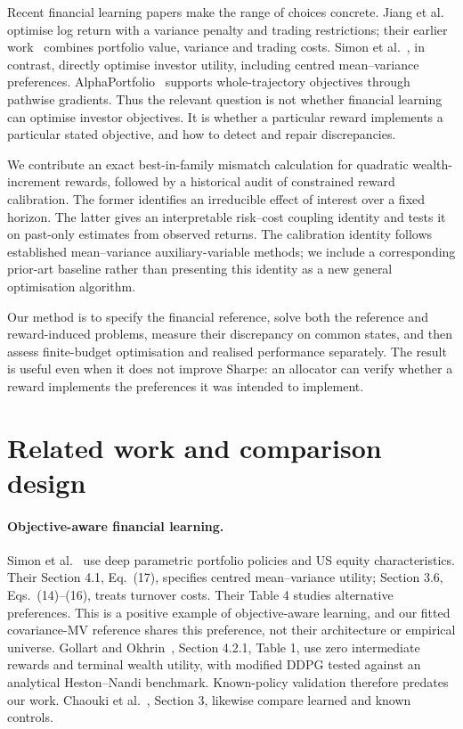 \documentclass[sigconf,anonymous,review,pbalance]{acmart}
\begin{document}
Recent financial learning papers make the range of choices concrete. Jiang et al.\ \cite{jiang2025} optimise log return with a variance penalty and trading restrictions; their earlier work\ \cite{jiang2024} combines portfolio value, variance and trading costs. Simon et al.\ \cite{simon2026}, in contrast, directly optimise investor utility, including centred mean--variance preferences. AlphaPortfolio\ \cite{cong2026} supports whole-trajectory objectives through pathwise gradients. Thus the relevant question is not whether financial learning can optimise investor objectives. It is whether a particular reward implements a particular stated objective, and how to detect and repair discrepancies.

We contribute an exact best-in-family mismatch calculation for quadratic wealth-increment rewards, followed by a historical audit of constrained reward calibration. The former identifies an irreducible effect of interest over a fixed horizon. The latter gives an interpretable risk--cost coupling identity and tests it on past-only estimates from observed returns. The calibration identity follows established mean--variance auxiliary-variable methods; we include a corresponding prior-art baseline rather than presenting this identity as a new general optimisation algorithm.

Our method is to specify the financial reference, solve both the reference and reward-induced problems, measure their discrepancy on common states, and then assess finite-budget optimisation and realised performance separately. The result is useful even when it does not improve Sharpe: an allocator can verify whether a reward implements the preferences it was intended to implement.

\section{Related work and comparison design}
\paragraph{Objective-aware financial learning.}
Simon et al.\ \cite{simon2026} use deep parametric portfolio policies and US equity characteristics. Their Section 4.1, Eq.\ (17), specifies centred mean--variance utility; Section 3.6, Eqs.\ (14)--(16), treats turnover costs. Their Table 4 studies alternative preferences. This is a positive example of objective-aware learning, and our fitted covariance-MV reference shares this preference, not their architecture or empirical universe. Gollart and Okhrin\ \cite{gollart2025}, Section 4.2.1, Table 1, use zero intermediate rewards and terminal wealth utility, with modified DDPG tested against an analytical Heston--Nandi benchmark. Known-policy validation therefore predates our work. Chaouki et al.\ \cite{chaouki2020}, Section 3, likewise compare learned and known controls.
\end{document}
